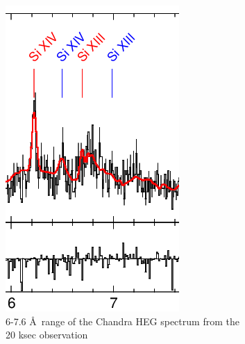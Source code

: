 \begin{figure}[h!]
    \centering
    \begin{subfigure}[t]{.3\textwidth}
        \centering
        \includegraphics[width=\linewidth]{Chapters/Figures/short_pheno_part2.png}
        \caption{6-7.6 \AA\ range of the Chandra HEG spectrum from the 20 ksec observation }
        \label{shortportion2}
    \end{subfigure}%
    \hspace*{4em}
    \begin{subfigure}[t]{.3\textwidth}

\end{subfigure}
\end{figure}
